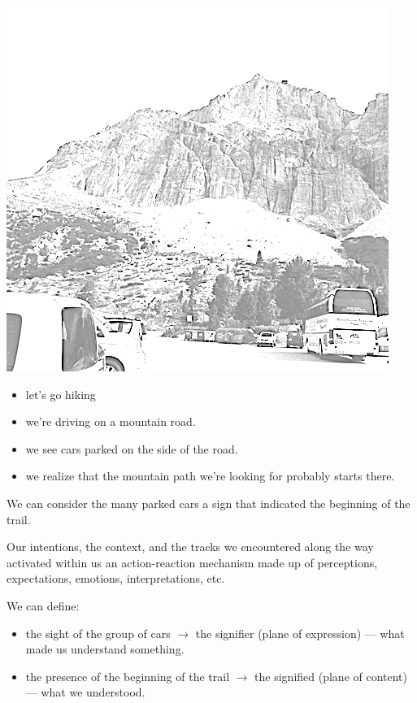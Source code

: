 \begin{center}
\includegraphics[scale=0.4]{../img/montagne.png}
\end{center}

\begin{itemize}
\tightlist
\item let's go hiking
\item we're driving on a mountain road.
\item we see cars parked on the side of the road.
\item we realize that the mountain path we're looking for probably starts there.
\end{itemize}

We can consider the many parked cars a sign that indicated the beginning of the trail.

Our intentions, the context, and the tracks we encountered along the way activated within us an action-reaction mechanism made up of perceptions, expectations, emotions, interpretations, etc.

We can define:

\begin{itemize}
\tightlist
\item the sight of the group of cars \(\rightarrow\) the signifier (plane of expression) --- what made us understand something.
\item the presence of the beginning of the trail \(\rightarrow\) the signified (plane of content) --- what we understood.
\end{itemize}

